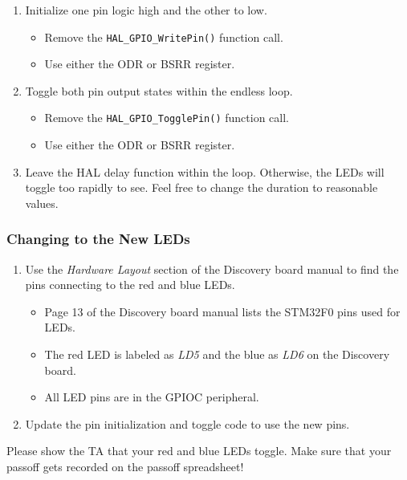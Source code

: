 \documentclass[openany,11pt,fleqn]{book} %
\begin{document}
\begin{enumerate}
    \item Initialize one pin logic high and the other to low.
    \begin{itemize}
        \item Remove the \texttt{HAL\_GPIO\_WritePin()} function call.
        \item Use either the ODR or BSRR register.  
    \end{itemize}
    \item Toggle both pin output states within the endless loop.
    \begin{itemize}
        \item Remove the \texttt{HAL\_GPIO\_TogglePin()} function call.
        \item Use either the ODR or BSRR register. 
    \end{itemize}
    \item Leave the HAL delay function within the loop. Otherwise, the LEDs will toggle too rapidly to see. Feel free to change the duration to reasonable values.
\end{enumerate}


\subsubsection{Changing to the New LEDs}

\begin{enumerate}
    \item Use the \textit{Hardware Layout} section of the Discovery board manual to find the pins connecting to the red and blue LEDs.  
    \begin{itemize}
        \item Page 13 of the Discovery board manual lists the STM32F0 pins used for LEDs.
        \item The red LED is labeled as \textit{LD5} and the blue as \textit{LD6} on the Discovery board.
        \item All LED pins are in the GPIOC peripheral. 
    \end{itemize}
    \item Update the pin initialization and toggle code to use the new pins.
\end{enumerate}

\begin{assignment}
	Please show the TA that your red and blue LEDs toggle. Make sure that your passoff gets recorded on the passoff spreadsheet!
\end{assignment}
\end{document}
